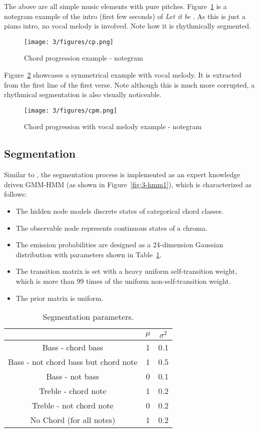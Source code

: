 The above are all simple music elements with pure pitches. Figure~\ref{fig:3-cp} is a notegram example of the intro (first few seconds) of {\it Let it be} . As this is just a piano intro, no vocal melody is involved. Note how it is rhythmically segmented.
\begin{figure}
\centering
\texttt{[image: 3/figures/cp.png]}
\caption{Chord progression example - notegram}
\label{fig:3-cp}
\end{figure}
Figure~\ref{fig:3-cpm} showcases a symmetrical example with vocal melody. It is extracted from the first line of the first verse. Note although this is much more corrupted, a rhythmical segmentation is also visually noticeable.
\begin{figure}
\centering
\texttt{[image: 3/figures/cpm.png]}
\caption{Chord progression with vocal melody example - notegram}
\label{fig:3-cpm}
\end{figure}

\newpage
\subsection{Segmentation} \label{sec:3-chordino-like sg}
Similar to \cite{cannam2013mirex}, the segmentation process is implemented as an expert knowledge driven GMM-HMM (as shown in Figure~\ref{fig:3-hmm1}), which is characterized as follows:
\begin{itemize}
\item The hidden node models discrete states of categorical chord classes.

\item The observable node represents continuous states of a chroma.

\item The emission probabilities are designed as a 24-dimension Gaussian distribution with parameters shown in Table~\ref{tab:3-gaussian}.

\item The transition matrix is set with a heavy uniform self-transition weight, which is more than 99 times of the uniform non-self-transition weight. 

\item The prior matrix is uniform.
\end{itemize}

\begin{table}
\caption{Segmentation parameters.}
\centering
\footnotesize
\begin{tabular}{|c|c|c|} \hline
      & $\mu$ & $\sigma^2$ \\ \hline
 Bass - chord bass & 1 & 0.1 \\ \hline
 Bass - not chord bass but chord note & 1 & 0.5  \\ \hline
 Bass - not bass & 0 & 0.1 \\ \hline
 Treble - chord note & 1 & 0.2  \\ \hline
 Treble - not chord note & 0 & 0.2 \\ \hline
 No Chord (for all notes)  & 1 & 0.2  \\ \hline
\end{tabular}
\label{tab:3-gaussian}
\end{table}

